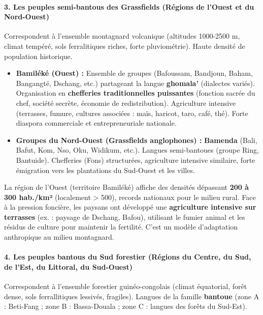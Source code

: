 \documentclass[11pt]{article}
\newcommand{\cle}[1]{{\popxbold\color{popdark}#1}}
\begin{document}
\paragraph{3. Les peuples semi-bantous des Grassfields (Régions de l'Ouest et du Nord-Ouest)}
Correspondent à l'ensemble \cle{montagnard volcanique} (altitudes 1000-2500 m, climat tempéré, sols ferralitiques riches, forte pluviométrie). Haute densité de population historique.

\begin{itemize}
    \item \textbf{Bamiléké (Ouest) :} Ensemble de groupes (Bafoussam, Bandjoun, Baham, Bangangté, Dschang, etc.) partageant la langue \textbf{ghomala'} (dialectes variés). Organisation en \textbf{chefferies traditionnelles puissantes} (fonction sacrée du chef, société secrète, économie de redistribution). Agriculture intensive (terrasses, fumure, cultures associées : maïs, haricot, taro, café, thé). Forte diaspora commerciale et entrepreneuriale nationale.
    \item \textbf{Groupes du Nord-Ouest (Grassfields anglophones) :} \textbf{Bamenda} (Bali, Bafut, Kom, Nso, Oku, Widikum, etc.). Langues semi-bantoues (groupe Ring, Bantuide). Chefferies (Fons) structurées, agriculture intensive similaire, forte émigration vers les plantations du Sud-Ouest et les villes.
\end{itemize}

\begin{exemplebox}
La région de l'Ouest (territoire Bamiléké) affiche des densités dépassant \textbf{200 à 300 hab./km²} (localement > 500), records nationaux pour le milieu rural. Face à la pression foncière, les paysans ont développé une \textbf{agriculture intensive sur terrasses} (ex. : paysage de Dschang, Bafou), utilisant le fumier animal et les résidus de culture pour maintenir la fertilité. C'est un modèle d'adaptation anthropique au milieu montagnard.
\end{exemplebox}

\paragraph{4. Les peuples bantous du Sud forestier (Régions du Centre, du Sud, de l'Est, du Littoral, du Sud-Ouest)}
Correspondent à l'ensemble \cle{forestier guinéo-congolais} (climat équatorial, forêt dense, sols ferrallitiques lessivés, fragiles). Langues de la famille \textbf{bantoue} (zone A : Beti-Fang ; zone B : Bassa-Douala ; zone C : langues des forêts du Sud-Est).
\end{document}
